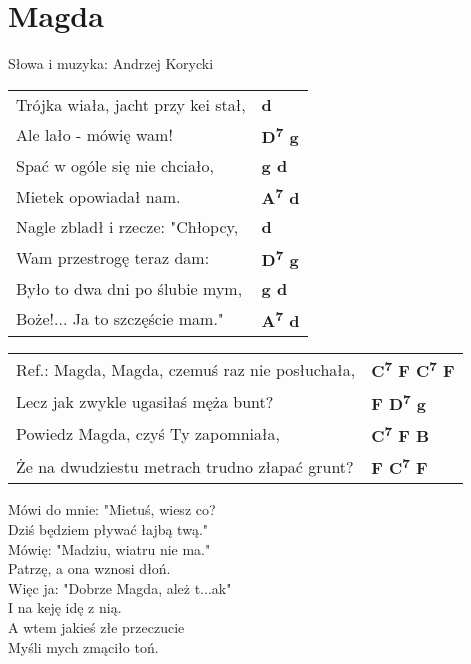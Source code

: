 \section{Magda}

Słowa i muzyka: Andrzej Korycki\\

\vspace{2em}
\begin{tabular}{@{}p{9cm}@{}l@{}}
Trójka wiała, jacht przy kei stał, & \bfseries  d \\
Ale lało - mówię wam! & \bfseries  D\textsuperscript{7} g \\
Spać w ogóle się nie chciało, & \bfseries  g d \\
Mietek opowiadał nam. & \bfseries  A\textsuperscript{7} d \\
Nagle zbladł i rzecze: "Chłopcy, & \bfseries  d \\
Wam przestrogę teraz dam: & \bfseries  D\textsuperscript{7} g \\
Było to dwa dni po ślubie mym, & \bfseries  g d \\
Boże!... Ja to szczęście mam." & \bfseries  A\textsuperscript{7} d \\
\end{tabular}

\vspace{1em}
\begin{tabular}{@{}p{9cm}@{}l@{}}
Ref.: Magda, Magda, czemuś raz nie posłuchała, & \bfseries C\textsuperscript{7} F C\textsuperscript{7} F \\
Lecz jak zwykle ugasiłaś męża bunt? & \bfseries F D\textsuperscript{7} g \\
Powiedz Magda, czyś Ty zapomniała, & \bfseries C\textsuperscript{7} F B \\
Że na dwudziestu metrach trudno złapać grunt? & \bfseries F C\textsuperscript{7} F \\
\end{tabular}

\vspace{1em}
Mówi do mnie: "Mietuś, wiesz co? \\
Dziś będziem pływać łajbą twą." \\
Mówię: "Madziu, wiatru nie ma." \\
Patrzę, a ona wznosi dłoń. \\
Więc ja: "Dobrze Magda, ależ t...ak" \\
I na keję idę z nią. \\
A wtem jakieś złe przeczucie \\
Myśli mych zmąciło toń. \\

